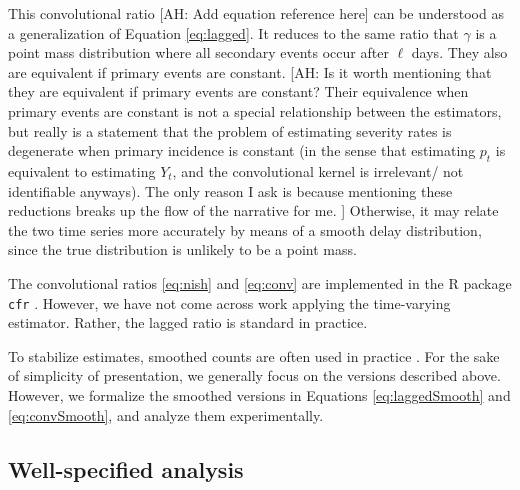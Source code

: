 \documentclass{article}
\newcommand{\ahcomment}[1]{{\color{red}[AH: #1]}}
\begin{document}
\noindent This convolutional ratio \ahcomment{Add equation reference here} can be understood as a generalization of Equation \eqref{eq:lagged}. It reduces to the same ratio that ${\gamma}$ is a point mass distribution where all secondary events occur after $\ell$ days. They also are equivalent if primary events are constant.
\ahcomment{
  Is it worth mentioning that they are equivalent if primary events are
  constant?  Their equivalence when primary events are constant is not
  a special relationship between the estimators, but really is a statement
  that the problem of estimating severity rates is degenerate when
  primary incidence is constant (in the sense that estimating $p_t$ is
  equivalent to estimating $Y_t$, and the convolutional kernel is irrelevant/
  not identifiable anyways).  The only reason I ask is because mentioning these
  reductions breaks up the flow of the narrative for me.
}
Otherwise, it may relate the two time series more accurately by means of a smooth delay distribution, since the true distribution is unlikely to be a point mass. 

The convolutional ratios \eqref{eq:nish} and \eqref{eq:conv} are implemented in the R package \texttt{cfr} \citep{cfr_package}. However, we have not come across work applying the time-varying estimator. Rather, the lagged ratio is standard in practice.


To stabilize estimates, smoothed counts are often used in practice \citep{germany,timevar_ifr,LIU2023100350}. For the sake of simplicity of presentation, we generally focus on the versions described above. However, we formalize the smoothed versions in Equations \eqref{eq:laggedSmooth} and \eqref{eq:convSmooth}, and analyze them experimentally.


\subsection{Well-specified analysis}\label{sec:analysis}
\end{document}
